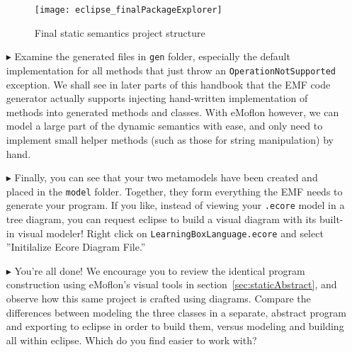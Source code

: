 \begin{itemize}
\begin{figure}[htbp]
	\centering
  \texttt{[image: eclipse\_finalPackageExplorer]}
	\caption{Final static semantics project structure}
	\label{fig:builtModel}
\end{figure}

\item[$\blacktriangleright$] Examine the generated files in \texttt{gen} folder, especially the default implementation for all methods that just throw an
\texttt{OperationNotSupported} exception. We shall see in later parts of this handbook that the EMF code generator actually supports injecting hand-written
implementation of methods into generated methods and classes. With eMoflon however, we can model a large part of the dynamic semantics with ease, and only need
to implement small helper methods (such as those for string manipulation) by hand.

\item[$\blacktriangleright$] Finally, you can see that your two metamodels have been created and placed in the \texttt{model} folder. Together, they form
everything the EMF needs to generate your program. If you like, instead of viewing your \texttt{.ecore} model in a tree diagram, you can request eclipse to
build a visual diagram with its built-in visual modeler! Right click on \texttt{LearningBoxLanguage.ecore} and select ''Initilalize Ecore Diagram File.''


\item[$\blacktriangleright$] You're all done! We encourage you to review the identical program construction using eMoflon's visual tools in
section~\ref{sec:staticAbstract}, and observe how this same project is crafted using diagrams. Compare the differences between modeling the three classes in a
separate, abstract program and exporting to eclipse in order to build them, versus modeling and building all within eclipse. Which do you find easier to work
with?

\end{itemize}